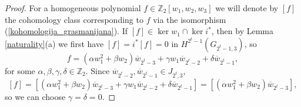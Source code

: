 \documentclass[10pt,a4paper]{amsart}
\begin{document}
\begin{proof}
    For a homogeneous polynomial $f\in\mathbb Z_2[w_1,w_2,w_3]$ we will denote by $[f]$ the cohomology class corresponding to $f$ via the isomorphism (\ref{kohomologija_grasmanijana}). If $[f]\in\ker w_1\cap \ker i^*$, then by Lemma \ref{naturality}(a) we first have $[f] = i^*[f] = 0$ in $H^{2^t-1}(G_{2^t-1,3})$, so 
    \[f = (\alpha w_1^2 + \beta w_2)\overline w_{2^t-3} + \gamma w_1\overline w_{2^t-2} + \delta \overline w_{2^t-1},\]
    for some $\alpha,\beta,\gamma,\delta\in\mathbb Z_2$. Since $\overline w_{2^t-2}, \overline w_{2^t-1}\in J_{2^t,3}$,
    \[[f] = [(\alpha w_1^2 + \beta w_2)\overline w_{2^t-3} + \gamma w_1\overline w_{2^t-2} + \delta \overline w_{2^t-1}] = [(\alpha w_1^2 + \beta w_2)\overline w_{2^t-3}],\]
    so we can choose $\gamma = \delta = 0$. 


\end{proof}
\end{document}
